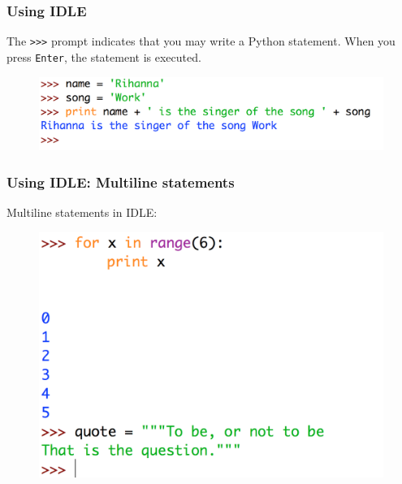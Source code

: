 \documentclass{beamer}
\newcommand{\<}{\langle}
\renewcommand{\>}{\rangle}
\begin{document}
\begin{frame}[fragile]
\frametitle{Using IDLE}

The \verb|>>>| prompt indicates that you may write a Python statement. When you press \verb|Enter|, the statement is executed.
\begin{figure}
\centering
\includegraphics[scale=.4]{IMG/2idle.png}
\end{figure}
\end{frame}


\begin{frame}
\frametitle{Using IDLE: Multiline statements}

Multiline statements in IDLE:

\begin{figure}
\centering
\includegraphics[scale=.3]{IMG/3idle.png}
\end{figure}
\end{frame}
\end{document}
